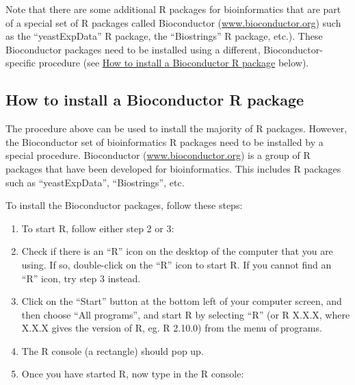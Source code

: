 \documentclass[a4paper,10pt,english]{sphinxmanual}
\begin{document}
Note that there are some additional R packages for bioinformatics that are part of a special
set of R packages called Bioconductor (\href{http://www.bioconductor.org/}{www.bioconductor.org})
such as the ``yeastExpData'' R package, the ``Biostrings'' R package, etc.).
These Bioconductor packages need to be installed using a different, Bioconductor-specific procedure
(see {\hyperref[src/installr:how-to-install-a-bioconductor-r-package]{How to install a Bioconductor R package}} below).


\subsection{How to install a Bioconductor R package}
\label{src/installr:how-to-install-a-bioconductor-r-package}
The procedure above can be used to install the majority of R packages. However, the
Bioconductor set of bioinformatics R packages need to be installed by a special procedure.
Bioconductor (\href{http://www.bioconductor.org/}{www.bioconductor.org})
is a group of R packages that have been developed for bioinformatics. This includes
R packages such as ``yeastExpData'', ``Biostrings'', etc.

To install the Bioconductor packages, follow these steps:
\begin{enumerate}
\item {} 
To start R, follow either step 2 or 3:

\item {} 
Check if there is an ``R'' icon on the desktop of the computer that you are using.
If so, double-click on the ``R'' icon to start R. If you cannot find an ``R'' icon, try step 3 instead.

\item {} 
Click on the ``Start'' button at the bottom left of your computer screen, and then choose ``All programs'', and start R by selecting ``R''  (or R X.X.X, where X.X.X gives the version of R, eg. R 2.10.0) from the menu of programs.

\item {} 
The R console (a rectangle) should pop up.

\item {} 
Once you have started R, now type in the R console:

\end{enumerate}
\end{document}
